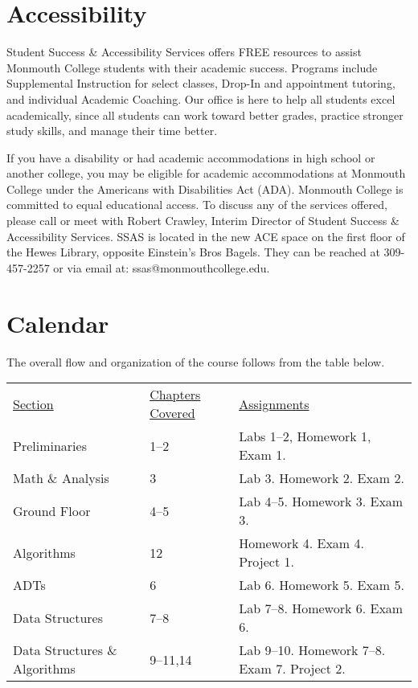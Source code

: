 \documentclass[10pt]{article}
\begin{document}
\section{Accessibility}

Student Success \& Accessibility Services offers FREE resources to assist Monmouth College students with their academic success. Programs include Supplemental Instruction for select classes, Drop-In and appointment tutoring, and individual Academic Coaching. Our office is here to help all students excel academically, since all students can work toward better grades, practice stronger study skills, and manage their time better.

If you have a disability or had academic accommodations in high school or another college, you may be eligible for academic accommodations at Monmouth College under the Americans with Disabilities Act (ADA). Monmouth College is committed to equal educational access. To discuss any of the services offered, please call or meet with Robert Crawley, Interim Director of Student Success \& Accessibility Services.  SSAS is located in the new ACE space on the first floor of the Hewes Library, opposite Einstein’s Bros Bagels. They can be reached at 309-457-2257 or via email at: ssas@monmouthcollege.edu.



\section{Calendar}


The overall flow and organization of the course follows from the table below.
\begin{center}
\begin{tabular}{lll}
\underline{Section} & \underline{Chapters Covered} & \underline{Assignments} \\
Preliminaries & 1--2 & Labs 1--2, Homework 1, Exam 1. \\
Math \& Analysis & 3 & Lab 3. Homework 2. Exam 2. \\
Ground Floor & 4--5 & Lab 4--5. Homework 3. Exam 3. \\
Algorithms & 12 & Homework 4. Exam 4. Project 1. \\
ADTs & 6 & Lab 6. Homework 5. Exam 5. \\
Data Structures & 7--8 & Lab 7--8. Homework 6. Exam 6. \\
Data Structures \& Algorithms & 9--11,14 & Lab 9--10. Homework 7--8. Exam 7. Project 2.
\end{tabular}
\end{center}
\end{document}
